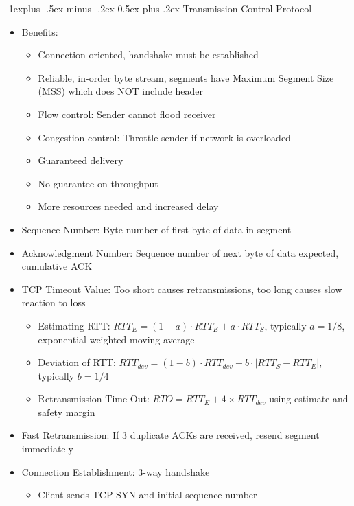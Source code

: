 \documentclass[10pt, landscape]{article}
\makeatletter
\renewcommand{\section}{\@startsection{section}{1}{0mm}%
                                {-1ex plus -.5ex minus -.2ex}%
                                {0.5ex plus .2ex}%
                                {\normalfont\large\bfseries}}
\renewcommand{\section}{\@startsection{section}{2}{0mm}%
                                {-1explus -.5ex minus -.2ex}%
                                {0.5ex plus .2ex}%
                                {\normalfont\normalsize\bfseries}}
\makeatother
\begin{document}
\begin{multicols*}{3}
\section{Transmission Control Protocol}
\begin{itemize}
    \item Benefits:
    \begin{itemize}
        \item Connection-oriented, handshake must be established
        \item Reliable, in-order byte stream, segments have Maximum Segment Size (MSS) which does NOT include header
        \item Flow control: Sender cannot flood receiver
        \item Congestion control: Throttle sender if network is overloaded
        \item Guaranteed delivery
    \end{itemize}
    \begin{itemize}
        \item No guarantee on throughput
        \item More resources needed and increased delay
    \end{itemize}
    \item Sequence Number: Byte number of first byte of data in segment
    \item Acknowledgment Number: Sequence number of next byte of data expected, cumulative ACK
    \item TCP Timeout Value: Too short causes retransmissions, too long causes slow reaction to loss
    \begin{itemize}
        \item Estimating RTT: $RTT_E=(1-a) \cdot RTT_E + a \cdot RTT_S$, typically $a=1/8$, exponential weighted moving average
        \item Deviation of RTT: $RTT_{dev}=(1-b) \cdot RTT_{dev}+b \cdot |RTT_S-RTT_E|$, typically $b=1/4$
        \item Retransmission Time Out: $RTO = RTT_E+4\times RTT_{dev}$ using estimate and safety margin
    \end{itemize}
    \item Fast Retransmission: If 3 duplicate ACKs are received, resend segment immediately
    \item Connection Establishment: 3-way handshake
    \begin{itemize}
        \item Client sends TCP SYN and initial sequence number

\end{itemize}
\end{itemize}
\end{multicols*}
\end{document}
